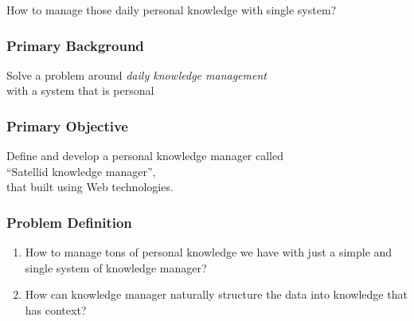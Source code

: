 \documentclass[10pt, compress]{beamer}
\begin{document}

\begin{frame}[fragile]
  \centering

  How to manage those \alert{daily personal knowledge} with \alert{single system}?

\end{frame}


\begin{frame}[fragile]
  \frametitle{Primary Background}

  Solve a problem around \alert{\emph{daily knowledge management}} \\
  with a system that is personal

\end{frame}


\begin{frame}[fragile]
  \frametitle{Primary Objective}

  Define and develop a personal knowledge manager called\\
  \alert{``Satellid knowledge manager''},\\
  that built using Web technologies.

\end{frame}


\begin{frame}[fragile]
  \frametitle{Problem Definition}

  \begin{enumerate}
    \item How to manage tons of personal knowledge we have with just a simple and single system of knowledge manager?
    \item How can knowledge manager naturally structure the data into knowledge that has context?
  \end{enumerate}

\end{frame}
\end{document}
